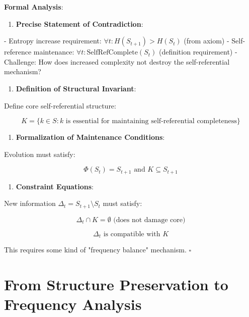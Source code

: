 \textbf{Formal Analysis}:

\begin{enumerate}
\item \textbf{Precise Statement of Contradiction}:
\end{enumerate}
   - Entropy increase requirement: $\forall t: H(S_{t+1}) > H(S_t)$ (from axiom)
   - Self-reference maintenance: $\forall t: \text{SelfRefComplete}(S_t)$ (definition requirement)
   - Challenge: How does increased complexity not destroy the self-referential mechanism?

\begin{enumerate}
\item \textbf{Definition of Structural Invariant}:
\end{enumerate}
   Define core self-referential structure:
   
\begin{equation}
K = \{k \in S: k \text{ is essential for maintaining self-referential completeness}\}
\end{equation}

\begin{enumerate}
\item \textbf{Formalization of Maintenance Conditions}:
\end{enumerate}
   Evolution must satisfy:
   
\begin{equation}
\Phi(S_t) = S_{t+1} \text{ and } K \subseteq S_{t+1}
\end{equation}

\begin{enumerate}
\item \textbf{Constraint Equations}:
\end{enumerate}
   New information $\Delta_t = S_{t+1} \setminus S_t$ must satisfy:
   
\begin{equation}
\Delta_t \cap K = \emptyset \text{ (does not damage core)}
\end{equation}
   
\begin{equation}
\Delta_t \text{ is compatible with } K
\end{equation}

This requires some kind of "frequency balance" mechanism. $\square$

\section{From Structure Preservation to Frequency Analysis}
\label{sec:ch06_riemann:from-structure-preservation-to-frequency-analysis}

